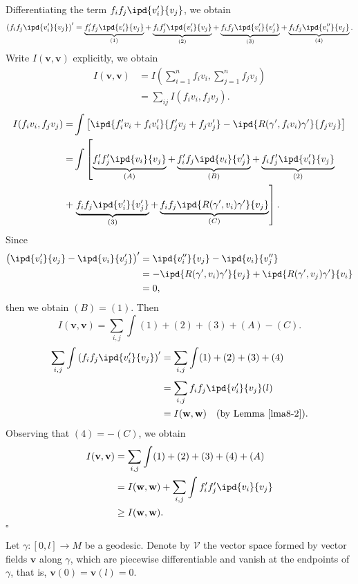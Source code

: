 Differentiating the term $f_i f_j\ipd{v_i'}{v_j}$, we obtain
\[
  \left( f_if_j\ipd{v_i'}{v_j} \right)'=\underbrace{f_i'f_j\ipd{v_i'}{v_j}}_{(1)}+\underbrace{f_if_j'\ipd{v_i'}{v_j}}_{(2)}+\underbrace{f_if_j \ipd{v_i'}{v_j'}}_{(3)}+\underbrace{f_if_j\ipd{v_i''}{v_j}}_{(4)}.
\]
Write $I(\mathbf{v},\mathbf{v})$ explicitly, we obtain
\begin{align*}
  I(\mathbf{v},\mathbf{v})&= I\left( \sum_{i=1}^{n} f_iv_i,\sum_{j=1}^{n} f_jv_j \right)\\
  &= \sum_{i j}^{} I\left( f_iv_i,f_jv_j \right) .
\end{align*}
\begin{align*}
  I(f_iv_i,f_jv_j)=&\int \left[ \ipd{f_i'v_i+f_iv_i'}{f_j'v_j+f_jv_j'}-\ipd{R(\gamma',f_iv_i)\gamma'}{f_jv_j} \right]\\
  =& \int \left[ \underbrace{f_i'f_j'\ipd{v_i}{v_j}}_{(A)}+\underbrace{f_i'f_j\ipd{v_i}{v_j'}}_{(B)}+\underbrace{f_if_j'\ipd{v_i'}{v_j}}_{(2)}\right.\\
  +&\left.\underbrace{f_if_j\ipd{v_i'}{v_j'}}_{(3)}+\underbrace{f_if_j\ipd{R(\gamma',v_i)\gamma'}{v_j}}_{(C)} \right] 
.\end{align*}
Since 
\begin{align*}
  \left( \ipd{v_i'}{v_j}-\ipd{v_i}{v_j'} \right) '&=\ipd{v_i''}{v_j}-\ipd{v_i}{v_j''}\\
  &= -\ipd{R(\gamma',v_i)\gamma'}{v_j}+\ipd{R(\gamma',v_j)\gamma'}{v_i}\\
  &=0,
\end{align*}
then we obtain $(B)=(1)$. Then 
 \[
   I(\mathbf{v},\mathbf{v})=\sum_{i,j}^{} \int(1)+(2)+(3)+(A)-(C).
\] 
\begin{align*}
  \sum_{i,j}^{} \int\left( f_if_j\ipd{v_i'}{v_j} \right) '&=\sum_{i,j}^{} \int(1)+(2)+(3)+(4)\\
  &=\sum_{i,j}^{} f_if_j\ipd{v_i'}{v_j}(l)\\
  &=I(\mathbf{w},\mathbf{w}) \quad (\text{by Lemma \ref{lma8-2}})
.\end{align*}
Observing that $(4)=-(C)$, we obtain
\begin{align*}
  I(\mathbf{v},\mathbf{v})&=\sum_{i,j}\int (1)+(2)+(3)+(4)+(A)\\
  &=I(\mathbf{w},\mathbf{w})+\sum_{i,j}^{} \int f_i'f_j'\ipd{v_i}{v_j}\\
  & \ge I(\mathbf{w},\mathbf{w})
.\end{align*}
\hfill $\square$

Let $\gamma:[0,l]\to M$ be a geodesic. Denote by $\mathcal{V}$ the vector space formed by vector fields $\mathbf{v}$ along $\gamma$, which are piecewise differentiable and vanish at the endpoints of $\gamma$, that is,  $\mathbf{v}(0)=\mathbf{v}(l)=0$.


